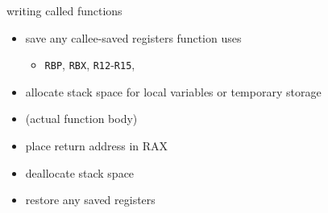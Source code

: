 \begin{frame}{writing called functions}
\begin{itemize}
\item save any callee-saved registers function uses
    \begin{itemize}
    \item \texttt{RBP}, \texttt{RBX}, \texttt{R12}-\texttt{R15}, 
    \end{itemize}
\item allocate stack space for local variables or temporary storage
\item (actual function body)
\item place return address in RAX
\item deallocate stack space
\item restore any saved registers
\end{itemize}
\end{frame}

